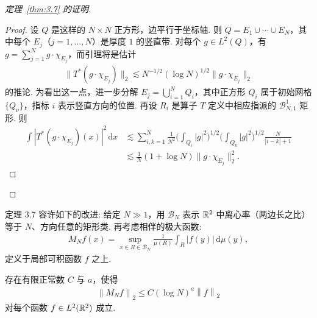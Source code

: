 \begin{proof}[定理~\ref{thm:3.7} 的证明]
\begin{proof}
设 $Q$ 是这样的 $N \times N$ 正方形，边平行于坐标轴. 则 $Q = E_1 \cup \cdots \cup E_N$，其中每个 $E_j$（$j = 1, \ldots, N$）是厚度 $1$ 的竖直带. 对每个 $g \in L^2(Q)$，有 $g = \sum_{j=1}^N g \cdot \chi_{E_j}$，而引理将是估计
\begin{align*}
  \|T^{*}(g\cdot\chi_{E_j})\|_{2}\lesssim N^{-1/2}\left(\log N\right)^{1/2}\|g\cdot\chi_{E_{j}}\|_{2}
\end{align*}
的推论. 为看出这一点，进一步分解 $E_j = \bigcup_{i=1}^{N} Q_i$，其中正方形 $Q_i$ 属于初始网格 $\{Q_\nu\}$，指标 $i$ 表示竖直方向的位置. 再设 $R_i$ 是算子 $T$ 定义中相应指派的 $\mathcal{B}_{N,1}^1$ 矩形. 则
\begin{align*}
  \int|T^{*}(g\cdot\chi_{E_{j}})(x)|^{2}\,\mathrm{d}x
  &\lesssim\sum_{i,k=1}^{N}\frac{1}{N^{2}}\Big(\int_{Q_{i}}|g|^{2}\Big)^{1/2}\Big(\int_{Q_{k}}|g|^{2}\Big)^{1/2}\frac{N}{|i-k|+1}\\
  &\lesssim\frac{1}{N}\left(1+\log N\right)\|g\cdot\chi_{E_{j}}\|_{2}^{2}.
\end{align*}
\end{proof}

\end{proof}

定理 3.7 容许如下的改进: 给定 $N \gg 1$，用 $\mathcal{B}_N$ 表示 $\mathbb{R}^2$ 中离心率（两边长之比）等于 $N$、方向任意的矩形类. 再考虑相伴的极大函数:
\begin{align*}
  M_N f(x)=\sup_{x\in R\in\mathcal{B}_{N}}\frac{1}{\mu(R)}\int_{R}\left|f(y)\right|\,\mathrm{d}\mu(y),
\end{align*}
定义于局部可积函数 $f$ 之上.

\begin{theorem}\label{thm:3.10}
存在有限正常数 $C$ 与 $a$，使得
\begin{align*}
  \left\|M_{N}f\right\|_{2}\leq C(\log N)^{a}\left\|f\right\|_{2}
\end{align*}
对每个函数 $f\in L^{2}(\mathbb{R}^{2})$ 成立.
\end{theorem}


